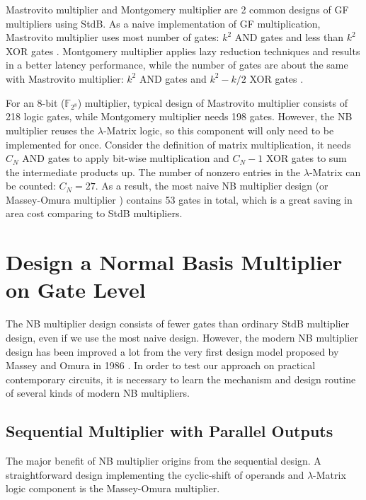 
Mastrovito multiplier \cite{mastro:1989} and Montgomery multiplier \cite{PT:1985} are 2 common designs
of GF multipliers using StdB. As a naive implementation of GF multiplication,
Mastrovito multiplier uses most number of gates:
$k^2$ AND gates and less than $k^2$ XOR gates \cite{Mastrovito}. Montgomery multiplier 
applies lazy reduction techniques and results in a better latency performance, while the number of gates are about
the same with Mastrovito multiplier:
$k^2$ AND gates and $k^2-k/2$ XOR gates \cite{wu:2002}. 

For an 8-bit ($\mathbb F_{2^8}$) multiplier, typical design of Mastrovito multiplier consists of 218 logic gates, while 
Montgomery multiplier needs 198 gates. However, the NB multiplier reuses the $\lambda$-Matrix 
logic, so this component will only need to be implemented for once. 
Consider the definition of matrix multiplication, it needs $C_N$ AND gates to apply 
bit-wise multiplication and $C_N-1$ XOR gates to sum the intermediate products up. The number of nonzero entries
in the $\lambda$-Matrix can be counted: $C_N = 27$.
As a result, the most naive NB multiplier design (or Massey-Omura multiplier \cite{MasseyOmura})
contains 53 gates in total, which is a great saving in area cost comparing to StdB multipliers.

\section{Design a Normal Basis Multiplier on Gate Level}
\label{sec:nbdesign}
The NB multiplier design consists of fewer gates than ordinary StdB multiplier design, even if 
we use the most naive design. However, the modern NB multiplier design has been improved a lot from the 
very first design model proposed by Massey and Omura in 1986 \cite{MasseyOmura}. In order to 
test our approach on practical contemporary circuits, it is necessary to learn the mechanism and design 
routine of several kinds of modern NB multipliers.
\subsection{Sequential Multiplier with Parallel Outputs}
The major benefit of NB multiplier origins from the sequential design. A straightforward design implementing 
the cyclic-shift of operands and $\lambda$-Matrix logic component is the Massey-Omura multiplier.


